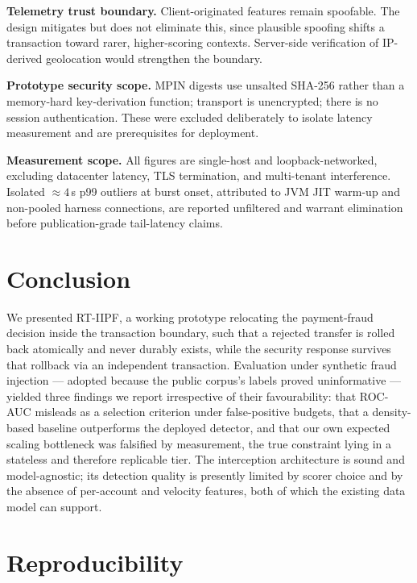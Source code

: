 \documentclass[conference]{IEEEtran}
\begin{document}
\textbf{Telemetry trust boundary.} Client-originated features remain
spoofable. The design mitigates but does not eliminate this, since plausible
spoofing shifts a transaction toward rarer, higher-scoring contexts.
Server-side verification of IP-derived geolocation would strengthen the
boundary.

\textbf{Prototype security scope.} MPIN digests use unsalted SHA-256 rather
than a memory-hard key-derivation function; transport is unencrypted; there
is no session authentication. These were excluded deliberately to isolate
latency measurement and are prerequisites for deployment.

\textbf{Measurement scope.} All figures are single-host and
loopback-networked, excluding datacenter latency, TLS termination, and
multi-tenant interference. Isolated ${\approx}4$\,s p99 outliers at burst
onset, attributed to JVM JIT warm-up and non-pooled harness connections,
are reported unfiltered and warrant elimination before publication-grade
tail-latency claims.

\section{Conclusion}

We presented RT-IIPF, a working prototype relocating the payment-fraud
decision inside the transaction boundary, such that a rejected transfer is
rolled back atomically and never durably exists, while the security response
survives that rollback via an independent transaction. Evaluation under
synthetic fraud injection --- adopted because the public corpus's labels
proved uninformative --- yielded three findings we report irrespective of
their favourability: that ROC-AUC misleads as a selection criterion under
false-positive budgets, that a density-based baseline outperforms the
deployed detector, and that our own expected scaling bottleneck was
falsified by measurement, the true constraint lying in a stateless and
therefore replicable tier. The interception architecture is sound and
model-agnostic; its detection quality is presently limited by scorer choice
and by the absence of per-account and velocity features, both of which the
existing data model can support.

\section*{Reproducibility}
\end{document}
